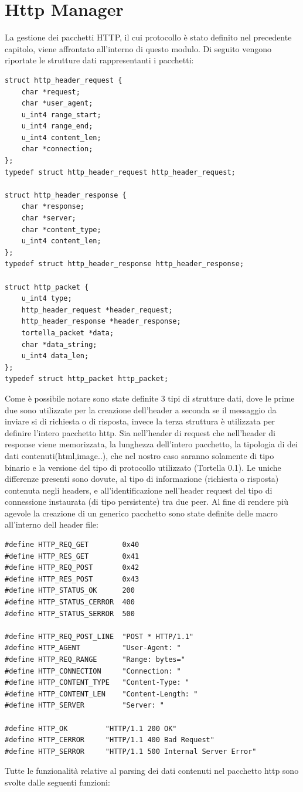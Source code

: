\section{Http Manager}
La gestione dei pacchetti HTTP, il cui protocollo è stato definito nel precedente capitolo, viene affrontato all'interno di questo modulo. Di seguito vengono riportate le strutture dati rappresentanti i pacchetti:
\begin{lstlisting}[frame=trBL]
struct http_header_request {
	char *request;
	char *user_agent;
	u_int4 range_start;
	u_int4 range_end;
	u_int4 content_len;
	char *connection;
};
typedef struct http_header_request http_header_request;

struct http_header_response {
	char *response;
	char *server;
	char *content_type;
	u_int4 content_len;
};
typedef struct http_header_response http_header_response;

struct http_packet {
	u_int4 type;
	http_header_request *header_request;
	http_header_response *header_response;
	tortella_packet *data;
	char *data_string;
	u_int4 data_len;
};
typedef struct http_packet http_packet;
\end{lstlisting}
Come è possibile notare sono state definite 3 tipi di strutture dati, dove le prime due sono utilizzate per la creazione dell'header a seconda se il messaggio da inviare si di richiesta o di risposta, invece la terza struttura è utilizzata per definire l'intero pacchetto http. Sia nell'header di request che nell'header di response viene memorizzata, la lunghezza dell'intero pacchetto, la tipologia di dei dati contenuti(html,image..), che nel nostro caso saranno solamente di tipo binario e la versione del tipo di protocollo utilizzato (Tortella 0.1). Le uniche differenze presenti sono dovute, al tipo di informazione (richiesta o risposta) contenuta negli headers, e all'identificazione nell'header request del tipo di connessione instaurata (di tipo persistente) tra due peer.
Al fine di rendere più agevole la creazione di un generico pacchetto sono state definite delle macro all'interno dell header file:
\begin{lstlisting}[frame=trBL]
#define HTTP_REQ_GET		0x40
#define	HTTP_RES_GET		0x41
#define HTTP_REQ_POST		0x42
#define HTTP_RES_POST		0x43
#define HTTP_STATUS_OK		200
#define	HTTP_STATUS_CERROR	400
#define HTTP_STATUS_SERROR	500

#define HTTP_REQ_POST_LINE	"POST * HTTP/1.1"
#define HTTP_AGENT			"User-Agent: "
#define HTTP_REQ_RANGE		"Range: bytes="
#define HTTP_CONNECTION		"Connection: "
#define HTTP_CONTENT_TYPE	"Content-Type: "
#define HTTP_CONTENT_LEN	"Content-Length: "
#define HTTP_SERVER			"Server: "

#define HTTP_OK			"HTTP/1.1 200 OK"
#define HTTP_CERROR		"HTTP/1.1 400 Bad Request"
#define HTTP_SERROR		"HTTP/1.1 500 Internal Server Error"
\end{lstlisting}
Tutte le funzionalità relative al parsing dei dati contenuti nel pacchetto http sono svolte dalle seguenti funzioni:
